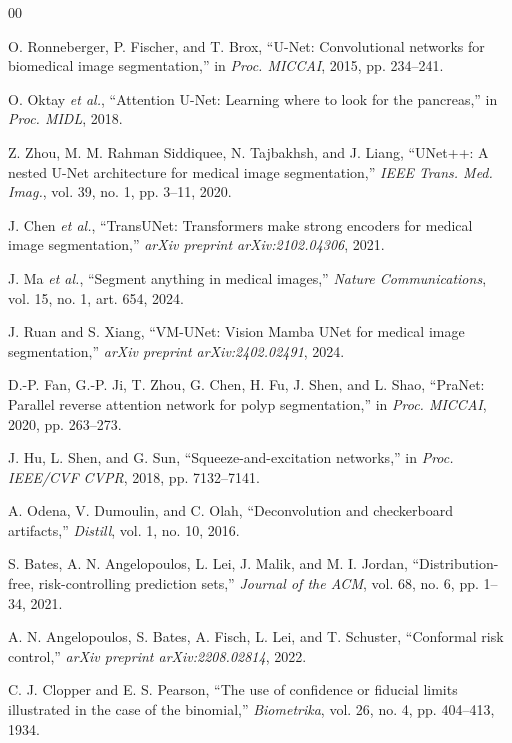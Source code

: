 \documentclass[journal]{IEEEtran}
\begin{document}

\begin{thebibliography}{00}

 O. Ronneberger, P. Fischer, and T. Brox, ``U-Net: Convolutional networks for biomedical image segmentation,'' in \emph{Proc. MICCAI}, 2015, pp. 234--241.

 O. Oktay \emph{et al.}, ``Attention U-Net: Learning where to look for the pancreas,'' in \emph{Proc. MIDL}, 2018.

 Z. Zhou, M. M. Rahman Siddiquee, N. Tajbakhsh, and J. Liang, ``UNet++: A nested U-Net architecture for medical image segmentation,'' \emph{IEEE Trans. Med. Imag.}, vol. 39, no. 1, pp. 3--11, 2020.

 J. Chen \emph{et al.}, ``TransUNet: Transformers make strong encoders for medical image segmentation,'' \emph{arXiv preprint arXiv:2102.04306}, 2021.

 J. Ma \emph{et al.}, ``Segment anything in medical images,'' \emph{Nature Communications}, vol. 15, no. 1, art. 654, 2024.

 J. Ruan and S. Xiang, ``VM-UNet: Vision Mamba UNet for medical image segmentation,'' \emph{arXiv preprint arXiv:2402.02491}, 2024.

 D.-P. Fan, G.-P. Ji, T. Zhou, G. Chen, H. Fu, J. Shen, and L. Shao, ``PraNet: Parallel reverse attention network for polyp segmentation,'' in \emph{Proc. MICCAI}, 2020, pp. 263--273.

 J. Hu, L. Shen, and G. Sun, ``Squeeze-and-excitation networks,'' in \emph{Proc. IEEE/CVF CVPR}, 2018, pp. 7132--7141.

 A. Odena, V. Dumoulin, and C. Olah, ``Deconvolution and checkerboard artifacts,'' \emph{Distill}, vol. 1, no. 10, 2016.

 S. Bates, A. N. Angelopoulos, L. Lei, J. Malik, and M. I. Jordan, ``Distribution-free, risk-controlling prediction sets,'' \emph{Journal of the ACM}, vol. 68, no. 6, pp. 1--34, 2021.

 A. N. Angelopoulos, S. Bates, A. Fisch, L. Lei, and T. Schuster, ``Conformal risk control,'' \emph{arXiv preprint arXiv:2208.02814}, 2022.

 C. J. Clopper and E. S. Pearson, ``The use of confidence or fiducial limits illustrated in the case of the binomial,'' \emph{Biometrika}, vol. 26, no. 4, pp. 404--413, 1934.


\end{thebibliography}
\end{document}
